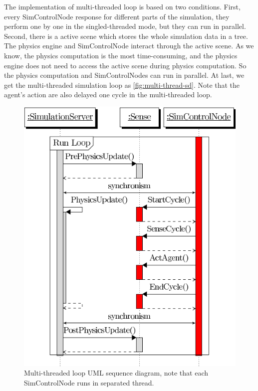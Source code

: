 The implementation of multi-threaded loop is based on two conditions.
First, every SimControlNode response for different parts of the
simulation, they perform one by one in the singled-threaded mode, but
they can run in parallel. Second, there is a active scene which stores
the whole simulation data in a tree. The physics engine and
SimControlNode interact through the active scene. As we know, the
physics computation is the most time-consuming, and the physics engine
does not need to access the active scene during physics computation.
So the physics computation and SimControlNodes can run in parallel. At
last, we get the multi-threaded simulation loop as
\autoref{fig:multi-thread-sd}. Note that the agent's action are also
delayed one cycle in the multi-threaded loop.
\begin{figure}[htp]
  \centering
  \includegraphics[height=0.5\textheight]{fig/serverMultiThreadLoop}
  \caption{Multi-threaded loop UML sequence diagram, note that
    each SimControlNode runs in separated thread.}
  \label{fig:multi-thread-sd}
\end{figure}

